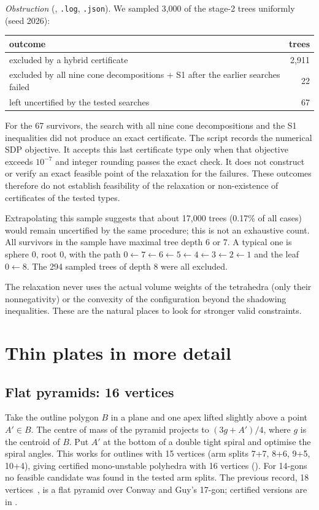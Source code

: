 \documentclass[11pt]{amsart}
\begin{document}
\emph{Obstruction} (, \texttt{.log}, \texttt{.json}). We sampled 3,000 of
the stage-2 trees uniformly (seed 2026):
\begin{center}
\begin{tabular}{lr}
\toprule
outcome & trees\\
\midrule
excluded by a hybrid certificate & 2,911\\
excluded by all nine cone decompositions + S1 after the earlier searches failed & 22\\
left uncertified by the tested searches & 67\\
\bottomrule
\end{tabular}
\end{center}
For the 67 survivors, the search with all nine cone decompositions and the S1 inequalities did not produce
an exact certificate. The script records the numerical SDP objective. It accepts this last certificate
type only when that objective exceeds $10^{-7}$ and integer rounding passes the exact check. It does not
construct or verify an exact feasible point of the relaxation for the failures. These outcomes therefore
do not establish feasibility of the relaxation or non-existence of certificates of the tested types.

Extrapolating this sample suggests that about 17,000 trees (0.17\% of all cases) would remain uncertified
by the same procedure; this is not an exhaustive count. All survivors in the sample have maximal tree
depth 6 or 7. A typical one is sphere 0, root 0, with the path
$0\leftarrow7\leftarrow6\leftarrow5\leftarrow4\leftarrow3\leftarrow2\leftarrow1$ and the leaf
$0\leftarrow8$. The 294 sampled trees of depth 8 were all excluded.

The relaxation never uses the actual volume weights of the tetrahedra (only their nonnegativity) or the
convexity of the configuration beyond the shadowing inequalities. These are the natural places to look
for stronger valid constraints.

\section{Thin plates in more detail}

\subsection{Flat pyramids: 16 vertices}
Take the outline polygon $B$ in a plane and one apex lifted slightly above a point $A'\in B$. The centre of
mass of the pyramid projects to $(3g+A')/4$, where $g$ is the centroid of $B$. Put $A'$ at the bottom of a
double tight spiral and optimise the spiral angles. This works for outlines with 15 vertices (arm splits
7+7, 8+6, 9+5, 10+4), giving certified mono-unstable polyhedra with 16 vertices
(). For 14-gons no feasible candidate was found in the tested arm
splits. The previous record, 18 vertices~\cite{DKLRV20}, is a flat pyramid over Conway and Guy's 17-gon;
certified versions are in .
\end{document}
